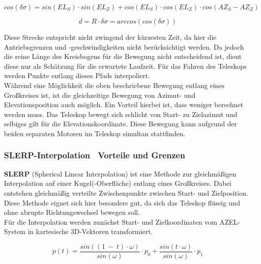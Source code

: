 \begin{equation}
    cos(\delta \sigma) = sin(EL_S) \cdot sin(EL_Z) + cos(EL_S) \cdot cos(EL_Z) \cdot cos(AZ_S - AZ_Z)
    \label{Winkelentfernung}
\end{equation}

\begin{equation}
    d = R \cdot \delta \sigma = arccos(cos(\delta \sigma))
    \label{Großkreisbogenlängenformel}
\end{equation}

Diese Strecke entspricht nicht zwingend der kürzesten Zeit, da hier die Antriebsgrenzen und -geschwindigkeiten nicht berücksichtigt werden.
Da jedoch die reine Länge des Kreisbogens für die Bewegung nicht entscheidend ist, dient diese nur als Schätzung für die erwartete Laufzeit. Für das Fahren des Teleskops werden Punkte entlang dieses Pfads interpoliert.
\\
Während eine Möglichkeit die oben beschriebene Bewegung entlang eines Großkreises ist, ist die gleichzeitige Bewegung von Azimut- und Elevationsposition auch möglich. Ein Vorteil hierbei ist, dass weniger berechnet werden muss. Das Teleskop bewegt sich schlicht von Start- zu Zielazimut und selbiges gilt für die Elevationskoordinate. Diese Bewegung kann aufgrund der beiden separaten Motoren im Teleskop simultan stattfinden.

\subsubsection{SLERP-Interpolation \textendash~Vorteile und Grenzen}

\textbf{SLERP} (Spherical Linear Interpolation) ist eine Methode zur gleichmäßigen Interpolation auf einer Kugel(-Oberfläche) entlang eines Großkreises. Dabei entstehen gleichmäßig verteilte Zwischenpunkte zwischen Start- und Zielposition.
Diese Methode eignet sich hier besonders gut, da sich das Teleskop flüssig und ohne abrupte Richtungswechsel bewegen soll.
\\
Für die Interpolation werden zunächst Start- und Zielkoordinaten vom AZEL-System in kartesische 3D-Vektoren transformiert.

\begin{equation}
    p(t) = \frac{sin((1~ - ~t) \cdot \omega)}{sin(\omega)} \cdot p_0 + \frac{sin(t \cdot \omega)}{sin(\omega)} \cdot p_1
    \label{Interpolationspunkte}
\end{equation}

